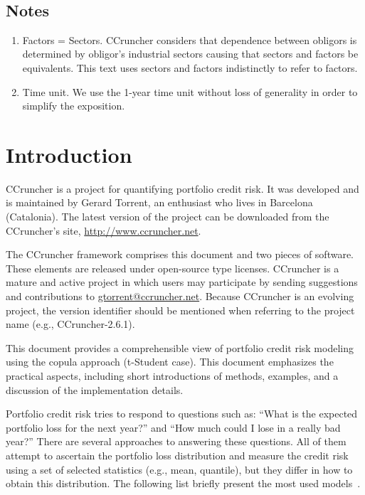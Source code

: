 \documentclass[11pt,fleqn]{book} %
\def\numversion{2.6.1}
\begin{document}
\glsaddall
\printglossary[style=super3colleft]
~\vfill
\section*{Notes}
\begin{enumerate}[leftmargin=*]
	\itemsep 0.5em
	\item Factors = Sectors. CCruncher considers that dependence between 
	obligors is determined by obligor's industrial sectors causing that 
	sectors and factors be equivalents. This text uses sectors and factors 
	indistinctly to refer to factors.
	\item Time unit. We use the 1-year time unit without loss of generality 
	in order to simplify the exposition.
\end{enumerate}
\cleardoublepage
\pagestyle{fancy}


\chapter{Introduction}

CCruncher is a project for quantifying portfolio credit risk. 
It was developed and is maintained by Gerard Torrent, an enthusiast  
who lives in Barcelona (Catalonia). The latest version 
of the project can be downloaded from the CCruncher's site, 
\url{http://www.ccruncher.net}.

The CCruncher framework comprises this document and two pieces of software. 
These elements are released under open-source type licenses. 
CCruncher is a mature and active project in which users may participate by 
sending suggestions and contributions to \href{mailto:gtorrent@ccruncher.net}
{gtorrent@ccruncher.net}. Because CCruncher is an evolving project, the version
identifier should be mentioned when referring to the project name 
(e.g., CCruncher-\numversion).

This document provides a comprehensible view of portfolio credit risk modeling 
using the copula approach (t-Student case). This document emphasizes the 
practical aspects, including short introductions of methods, examples, and 
a discussion of the implementation details. 

Portfolio credit risk tries to respond to questions such as: ``What is the 
expected portfolio loss for the next year?'' and ``How much could I 
lose in a really bad year?'' There are several approaches to answering these 
questions. All of them attempt to ascertain the portfolio loss distribution 
and measure the credit risk using a set of selected statistics (e.g., mean, 
quantile), but they differ in how to obtain this distribution. The following 
list briefly present the most used 
models~\cite{crouhy:2000,brereton:2012,mcneil:2003}\cite[chap. 2.4]{bluhm:2002}. 
\end{document}
